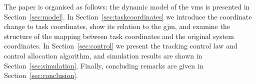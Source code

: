 \documentclass[../main.tex]{subfiles}
\begin{document}

The paper is organised as follows: the dynamic model of the \gls{vms} is presented in Section~\ref{sec:model}. In Section~\ref{sec:taskcoordinates} we introduce the coordinate change to task coordinates, show its relation to the \gls{gjm}, and examine the structure of the mapping between task coordinates and the original system coordinates. In Section~\ref{sec:control} we present the tracking control law and control allocation algorithm, and simulation results are shown in Section~\ref{sec:simulation}. Finally, concluding remarks are given in Section~\ref{sec:conclusion}.


\end{document}

